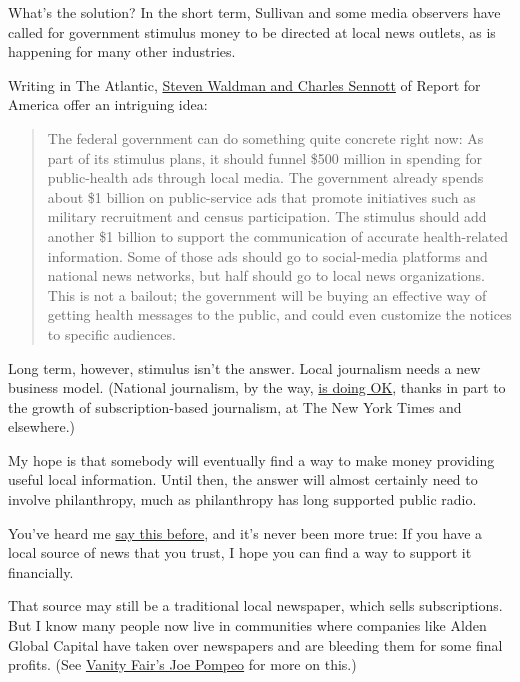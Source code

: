 What's the solution? In the short term, Sullivan and some media
observers have called for government stimulus money to be directed at
local news outlets, as is happening for many other industries.

Writing in The Atlantic,
\href{https://www.theatlantic.com/ideas/archive/2020/03/coronavirus-killing-local-news/608695/}{Steven
Waldman and Charles Sennott} of Report for America offer an intriguing
idea:

\begin{quote}
The federal government can do something quite concrete right now: As
part of its stimulus plans, it should funnel \$500 million in spending
for public-health ads through local media. The government already spends
about \$1 billion on public-service ads that promote initiatives such as
military recruitment and census participation. The stimulus should add
another \$1 billion to support the communication of accurate
health-related information. Some of those ads should go to social-media
platforms and national news networks, but half should go to local news
organizations. This is not a bailout; the government will be buying an
effective way of getting health messages to the public, and could even
customize the notices to specific audiences.
\end{quote}

Long term, however, stimulus isn't the answer. Local journalism needs a
new business model. (National journalism, by the way,
\href{https://www.niemanlab.org/2020/02/the-wall-street-journal-joins-the-new-york-times-in-the-2-million-digital-subscriber-club/}{is
doing OK}, thanks in part to the growth of subscription-based
journalism, at The New York Times and elsewhere.)

My hope is that somebody will eventually find a way to make money
providing useful local information. Until then, the answer will almost
certainly need to involve philanthropy, much as philanthropy has long
supported public radio.

You've heard me
\href{https://www.nytimes3xbfgragh.onion/2018/11/21/opinion/local-journalism-news-media.html}{say
this before}, and it's never been more true: If you have a local source
of news that you trust, I hope you can find a way to support it
financially.

That source may still be a traditional local newspaper, which sells
subscriptions. But I know many people now live in communities where
companies like Alden Global Capital have taken over newspapers and are
bleeding them for some final profits. (See
\href{https://www.vanityfair.com/news/2020/02/hedge-fund-vampire-alden-global-capital-that-bleeds-newspapers-dry-has-chicago-tribune-by-the-throat}{Vanity
Fair's Joe Pompeo} for more on this.)

